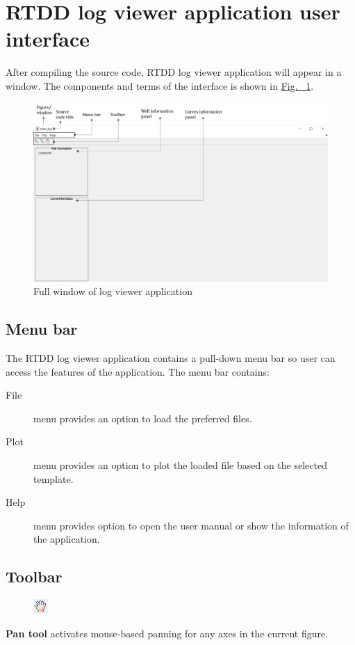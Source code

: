 \documentclass[12pt,a4paper,oneside]{report}
\begin{document}
\section{RTDD log viewer application user interface}
After compiling the source code, RTDD log viewer application will appear in a window. The components and terms of the interface is shown in \hyperref[fig:full_window]{Fig. ~\ref{fig:full_window}}.
\begin{figure}[h]
\centering
\includegraphics[width=1\textwidth]{fig/full_win_desc.png}
\caption{Full window of log viewer application}
\label{fig:full_window}
\end{figure}

\subsection{Menu bar}
The RTDD log viewer application contains a pull-down menu bar so user can access the features of the application. The menu bar contains:
\begin{description}
\item[File] menu provides an option to load the preferred files.
\item[Plot] menu provides an option to plot the loaded file based on the selected template.
\item[Help] menu provides option to open the user manual or show the information of the application.
\end{description}


\subsection{Toolbar}
\begin{figure}
\vspace{-15pt}
\includegraphics[scale=1]{fig/scopes_button_pan.png}
\end{figure}
\textbf{Pan tool} activates mouse-based panning for any axes in the current figure.
\end{document}
